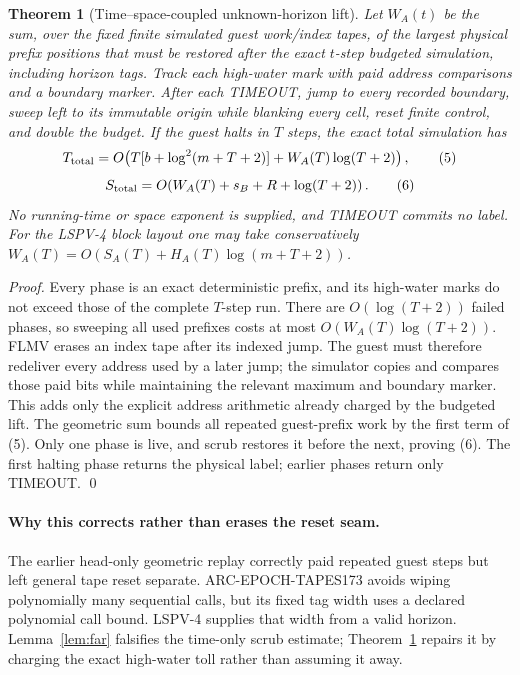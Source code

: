 \documentclass[11pt]{article}
\newtheorem{theorem}{Theorem}
\begin{document}
\begin{theorem}[Time--space-coupled unknown-horizon lift]\label{th:coupled}
Let $W_A(t)$ be the sum, over the fixed finite simulated guest work/index tapes,
of the largest physical prefix positions that must be restored after the exact
$t$-step budgeted simulation, including horizon tags.  Track each high-water
mark with paid address comparisons and a boundary marker.  After each TIMEOUT,
jump to every recorded boundary, sweep left to its immutable origin while
blanking every cell, reset finite control, and double the budget.  If the guest
halts in $T$ steps, the exact total simulation has
\[
 T_{\rm total}=O\!\left(
 T[b+\log^2(m+T+2)]+W_A(T)\log(T+2)\right),                            \tag{5}
\]
\[
 S_{\rm total}=O\!\left(W_A(T)+s_B+R+\log(T+2)\right).                 \tag{6}
\]
No running-time or space exponent is supplied, and TIMEOUT commits no label.
For the LSPV-4 block layout one may take conservatively
$W_A(T)=O(S_A(T)+H_A(T)\log(m+T+2))$.
\end{theorem}
\begin{proof}
Every phase is an exact deterministic prefix, and its high-water marks do not
exceed those of the complete $T$-step run.  There are $O(\log(T+2))$ failed
phases, so sweeping all used prefixes costs at most
$O(W_A(T)\log(T+2))$.  FLMV erases an index tape after its indexed jump.  The
guest must therefore redeliver every address used by a later jump; the simulator
copies and compares those paid bits while maintaining the relevant maximum and
boundary marker.  This adds only the explicit address arithmetic already charged
by the budgeted lift.  The geometric sum bounds all repeated guest-prefix work
by the first term of (5).  Only one phase is live, and scrub restores it before
the next, proving (6).  The first halting phase returns the physical label;
earlier phases return only TIMEOUT. \qed
\end{proof}

\paragraph{Why this corrects rather than erases the reset seam.}
The earlier head-only geometric replay correctly paid repeated guest steps but
left general tape reset separate.  ARC-EPOCH-TAPES173 avoids wiping polynomially
many sequential calls, but its fixed tag width uses a declared polynomial call
bound.  LSPV-4 supplies that width from a valid horizon.  Lemma~\ref{lem:far}
falsifies the time-only scrub estimate; Theorem~\ref{th:coupled} repairs it by
charging the exact high-water toll rather than assuming it away.
\end{document}
